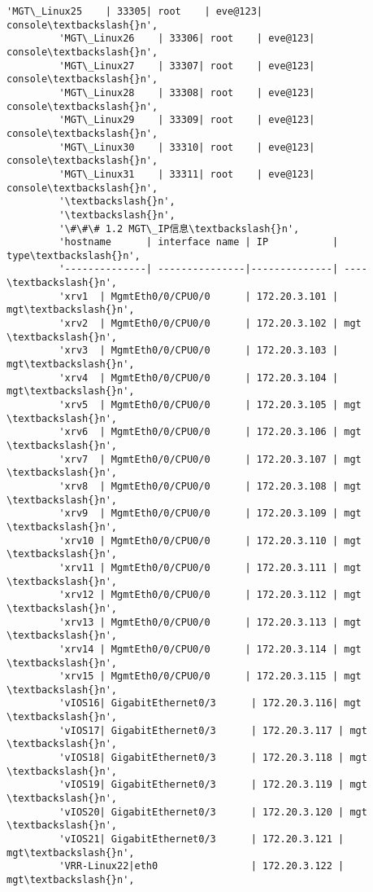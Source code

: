 \documentclass[11pt]{article}
\begin{document}
\begin{Verbatim}[commandchars=\\\{\}]
         'MGT\_Linux25    | 33305| root    | eve@123| console\textbackslash{}n',
         'MGT\_Linux26    | 33306| root    | eve@123| console\textbackslash{}n',
         'MGT\_Linux27    | 33307| root    | eve@123| console\textbackslash{}n',
         'MGT\_Linux28    | 33308| root    | eve@123| console\textbackslash{}n',
         'MGT\_Linux29    | 33309| root    | eve@123| console\textbackslash{}n',
         'MGT\_Linux30    | 33310| root    | eve@123| console\textbackslash{}n',
         'MGT\_Linux31    | 33311| root    | eve@123| console\textbackslash{}n',
         '\textbackslash{}n',
         '\textbackslash{}n',
         '\#\#\# 1.2 MGT\_IP信息\textbackslash{}n',
         'hostname      | interface name | IP           | type\textbackslash{}n',
         '--------------| ---------------|--------------| ----\textbackslash{}n',
         'xrv1  | MgmtEth0/0/CPU0/0      | 172.20.3.101 | mgt\textbackslash{}n',
         'xrv2  | MgmtEth0/0/CPU0/0      | 172.20.3.102 | mgt \textbackslash{}n',
         'xrv3  | MgmtEth0/0/CPU0/0      | 172.20.3.103 | mgt\textbackslash{}n',
         'xrv4  | MgmtEth0/0/CPU0/0      | 172.20.3.104 | mgt\textbackslash{}n',
         'xrv5  | MgmtEth0/0/CPU0/0      | 172.20.3.105 | mgt \textbackslash{}n',
         'xrv6  | MgmtEth0/0/CPU0/0      | 172.20.3.106 | mgt \textbackslash{}n',
         'xrv7  | MgmtEth0/0/CPU0/0      | 172.20.3.107 | mgt \textbackslash{}n',
         'xrv8  | MgmtEth0/0/CPU0/0      | 172.20.3.108 | mgt \textbackslash{}n',
         'xrv9  | MgmtEth0/0/CPU0/0      | 172.20.3.109 | mgt \textbackslash{}n',
         'xrv10 | MgmtEth0/0/CPU0/0      | 172.20.3.110 | mgt \textbackslash{}n',
         'xrv11 | MgmtEth0/0/CPU0/0      | 172.20.3.111 | mgt \textbackslash{}n',
         'xrv12 | MgmtEth0/0/CPU0/0      | 172.20.3.112 | mgt \textbackslash{}n',
         'xrv13 | MgmtEth0/0/CPU0/0      | 172.20.3.113 | mgt \textbackslash{}n',
         'xrv14 | MgmtEth0/0/CPU0/0      | 172.20.3.114 | mgt \textbackslash{}n',
         'xrv15 | MgmtEth0/0/CPU0/0      | 172.20.3.115 | mgt \textbackslash{}n',
         'vIOS16| GigabitEthernet0/3      | 172.20.3.116| mgt  \textbackslash{}n',
         'vIOS17| GigabitEthernet0/3      | 172.20.3.117 | mgt \textbackslash{}n',
         'vIOS18| GigabitEthernet0/3      | 172.20.3.118 | mgt \textbackslash{}n',
         'vIOS19| GigabitEthernet0/3      | 172.20.3.119 | mgt \textbackslash{}n',
         'vIOS20| GigabitEthernet0/3      | 172.20.3.120 | mgt  \textbackslash{}n',
         'vIOS21| GigabitEthernet0/3      | 172.20.3.121 | mgt\textbackslash{}n',
         'VRR-Linux22|eth0                | 172.20.3.122 | mgt\textbackslash{}n',

\end{Verbatim}
\end{document}
